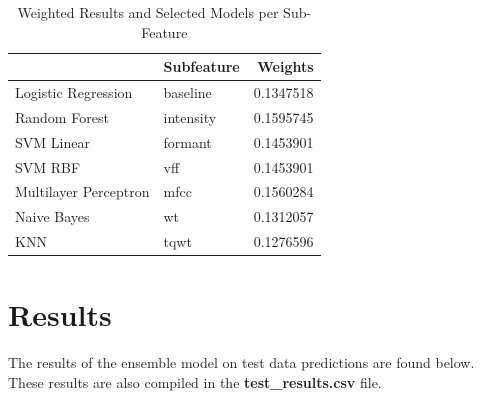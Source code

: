 \documentclass[
]{article}
\begin{document}
\begin{table}

\caption{\label{tab:unnamed-chunk-10}Weighted Results and Selected Models per Sub-Feature}
\centering
\begin{tabular}[t]{llr}
\toprule
  & Subfeature & Weights\\
\midrule
Logistic Regression & baseline & 0.1347518\\
Random Forest & intensity & 0.1595745\\
SVM Linear & formant & 0.1453901\\
SVM RBF & vff & 0.1453901\\
Multilayer Perceptron & mfcc & 0.1560284\\
\addlinespace
Naive Bayes & wt & 0.1312057\\
KNN & tqwt & 0.1276596\\
\bottomrule
\end{tabular}
\end{table}

\newpage

\hypertarget{results}{%
\section{Results}\label{results}}

The results of the ensemble model on test data predictions are found below. These results are also compiled in the \textbf{test\_results.csv} file.
\end{document}
